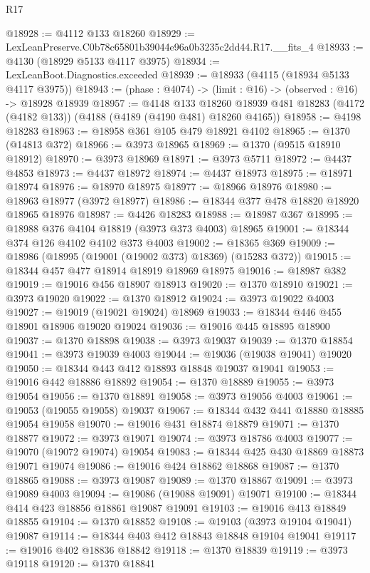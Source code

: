 \begin{lexlean}{R17}
\begin{coremodule}
@18928 := @4112 @133 @18260
@18929 := LexLeanPreserve.C0b78c65801b39044e96a0b3235c2dd44.R17.__fits_4
@18933 := @4130 (@18929 @5133 @4117 @3975)
@18934 := LexLeanBoot.Diagnostics.exceeded
@18939 := @18933 (@4115 (@18934 @5133 @4117 @3975))
@18943 := (phase : @4074) -> (limit : @16) -> (observed : @16) -> @18928 @18939
@18957 := @4148
    @133
    @18260
    @18939
    @481
    @18283
    (@4172 (@4182 @133))
    (@4188 (@4189 (@4190 @481) @18260 @4165))
@18958 := @4198 @18283
@18963 := @18958 @361 @105 @479 @18921 @4102
@18965 := @1370 (@14813 @372)
@18966 := @3973 @18965
@18969 := @1370 (@9515 @18910 @18912)
@18970 := @3973 @18969
@18971 := @3973 @5711
@18972 := @4437 @4853
@18973 := @4437 @18972
@18974 := @4437 @18973
@18975 := @18971 @18974
@18976 := @18970 @18975
@18977 := @18966 @18976
@18980 := @18963 @18977 (@3972 @18977)
@18986 := @18344 @377 @478 @18820 @18920 @18965 @18976
@18987 := @4426 @18283
@18988 := @18987 @367
@18995 := @18988 @376 @4104 @18819 (@3973 @373 @4003) @18965
@19001 := @18344 @374 @126 @4102 @4102 @373 @4003
@19002 := @18365 @369
@19009 := @18986 (@18995 (@19001 (@19002 @373) @18369) (@15283 @372))
@19015 := @18344 @457 @477 @18914 @18919 @18969 @18975
@19016 := @18987 @382
@19019 := @19016 @456 @18907 @18913
@19020 := @1370 @18910
@19021 := @3973 @19020
@19022 := @1370 @18912
@19024 := @3973 @19022 @4003
@19027 := @19019 (@19021 @19024) @18969
@19033 := @18344 @446 @455 @18901 @18906 @19020 @19024
@19036 := @19016 @445 @18895 @18900
@19037 := @1370 @18898
@19038 := @3973 @19037
@19039 := @1370 @18854
@19041 := @3973 @19039 @4003
@19044 := @19036 (@19038 @19041) @19020
@19050 := @18344 @443 @412 @18893 @18848 @19037 @19041
@19053 := @19016 @442 @18886 @18892
@19054 := @1370 @18889
@19055 := @3973 @19054
@19056 := @1370 @18891
@19058 := @3973 @19056 @4003
@19061 := @19053 (@19055 @19058) @19037
@19067 := @18344 @432 @441 @18880 @18885 @19054 @19058
@19070 := @19016 @431 @18874 @18879
@19071 := @1370 @18877
@19072 := @3973 @19071
@19074 := @3973 @18786 @4003
@19077 := @19070 (@19072 @19074) @19054
@19083 := @18344 @425 @430 @18869 @18873 @19071 @19074
@19086 := @19016 @424 @18862 @18868
@19087 := @1370 @18865
@19088 := @3973 @19087
@19089 := @1370 @18867
@19091 := @3973 @19089 @4003
@19094 := @19086 (@19088 @19091) @19071
@19100 := @18344 @414 @423 @18856 @18861 @19087 @19091
@19103 := @19016 @413 @18849 @18855
@19104 := @1370 @18852
@19108 := @19103 (@3973 @19104 @19041) @19087
@19114 := @18344 @403 @412 @18843 @18848 @19104 @19041
@19117 := @19016 @402 @18836 @18842
@19118 := @1370 @18839
@19119 := @3973 @19118
@19120 := @1370 @18841

\end{coremodule}
\end{lexlean}
